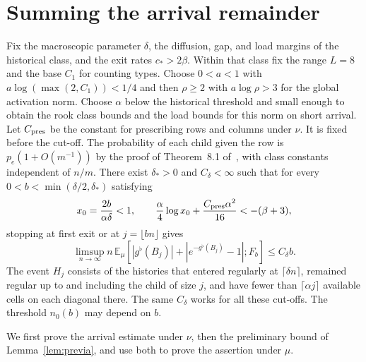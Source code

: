 \section{Summing the arrival remainder}\label{app:arrival}
\begin{lema}\label{lem:llegada-integrada}
Fix the macroscopic parameter \(\delta\), the diffusion, gap, and load margins of the historical class,
and the exit rates \(c_*>2\beta\). Within that class fix the range \(L=8\) and the base \(C_1\) for
counting types. Choose \(0<a<1\) with \(a\log(\max(2,C_1))<1/4\) and then \(\rho\ge2\) with
\(a\log\rho>3\) for the global activation norm. Choose \(\alpha\) below the historical threshold and
small enough to obtain the rook class bounds and the load bounds for this norm on short arrival. Let
\(C_{\rm pres}\) be the constant for prescribing rows and columns under \(\nu\). It is fixed before the
cut-off. The probability of each child given the row is \(p_e(1+O(m^{-1}))\) by the proof of Theorem~8.1
of~\cite{pc}, with class constants independent of \(n/m\). There exist \(\delta_*>0\) and
\(C_\delta<\infty\) such that for every \(0<b<\min(\delta/2,\delta_*)\) satisfying
\[
 x_0=\frac{2b}{\alpha\delta}<1,\qquad
 \frac{\alpha}{4}\log x_0+\frac{C_{\rm pres}\alpha^2}{16}<-(\beta+3),
\]
stopping at first exit or at \(j=\lfloor bn\rfloor\) gives
\begin{equation}\label{eq:arrival-estimate}
 \limsup_{n\to\infty} n\,\mathbb E_\mu
  [|g^\flat(B_j)|+|e^{-g^\flat(B_j)}-1|;F_b]\le C_\delta b .
\end{equation}
The event \(H_j\) consists of the histories that entered regularly at \(\lceil\delta n\rceil\), remained
regular up to and including the child of size \(j\), and have fewer than \(\lceil\alpha j\rceil\)
available cells on each diagonal there. The same \(C_\delta\) works for all these cut-offs. The threshold
\(n_0(b)\) may depend on \(b\).
\end{lema}
We first prove the arrival estimate under \(\nu\), then the preliminary bound of Lemma~\ref{lem:previa},
and use both to prove the assertion under \(\mu\).





